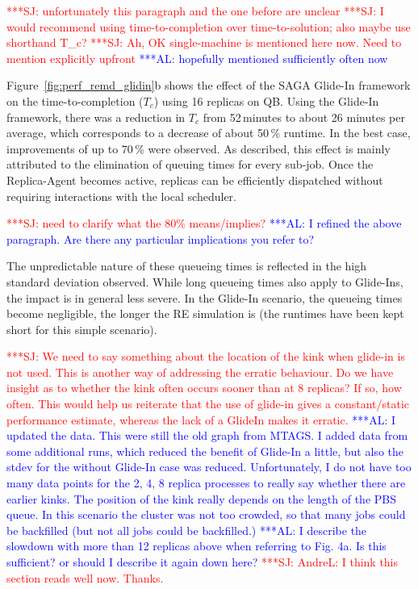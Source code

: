 \documentclass{rspublic}
\newcommand{\alnote}[1]{ {\textcolor{blue} { ***AL: #1 }}}
\newcommand{\jhanote}[1]{ {\textcolor{red} { ***SJ: #1 }}}
\newcommand{\alnote}[1]{}
\newcommand{\jhanote}[1]{}
\begin{document}
\jhanote{unfortunately this paragraph and the one before are unclear}
\jhanote{I would recommend using time-to-completion over
  time-to-solution; also maybe use shorthand T\_c?}  \jhanote{Ah, OK
  single-machine is mentioned here now. Need to mention explicitly
  upfront} \alnote{hopefully mentioned sufficiently often now}

Figure~\ref{fig:perf_remd_glidin}b shows the effect of the SAGA
Glide-In framework on the time-to-completion ($T_{c}$) using 16
replicas on QB.  Using the Glide-In framework, there was a reduction
in $T_{c}$ from 52\,minutes to about 26 minutes per average, which
corresponds to a decrease of about 50\,\% runtime.  In the best case,
improvements of up to 70\,\% were observed. As described, this effect
is mainly attributed to the elimination of queuing times for every
sub-job. Once the Replica-Agent becomes active, replicas can be
efficiently dispatched without requiring interactions with the local
scheduler.

\jhanote{need to clarify what the 80\% means/implies?} \alnote{I
  refined the above paragraph. Are there any particular implications
  you refer to?}

The unpredictable nature of these queueing times is reflected in the
high standard deviation observed. While long queueing times also apply
to Glide-Ins, the impact is in general less severe.  In the Glide-In
scenario, the queueing times become negligible, the longer the RE
simulation is (the runtimes have been kept short for this simple
scenario).

\jhanote{We need to say something about the location of the kink when
  glide-in is not used. This is another way of addressing the erratic
  behaviour. Do we have insight as to whether the kink often occurs
  sooner than at 8 replicas? If so, how often.  This would help us
  reiterate that the use of glide-in gives a constant/static
  performance estimate, whereas the lack of a GlideIn makes it
  erratic.}  \alnote{I updated the data. This were still the old graph
  from MTAGS. I added data from some additional runs, which reduced
  the benefit of Glide-In a little, but also the stdev for the without
  Glide-In case was reduced. Unfortunately, I do not have too many
  data points for the 2, 4, 8 replica processes to really say whether
  there are earlier kinks.  The position of the kink really depends on
  the length of the PBS queue. In this scenario the cluster was not
  too crowded, so that many jobs could be backfilled (but not all jobs
  could be backfilled.)}  \alnote{I describe the slowdown with more
  than 12 replicas above when referring to Fig. 4a. Is this
  sufficient? or should I describe it again down here?}
\jhanote{AndreL: I think this section reads well now. Thanks.}
\end{document}
